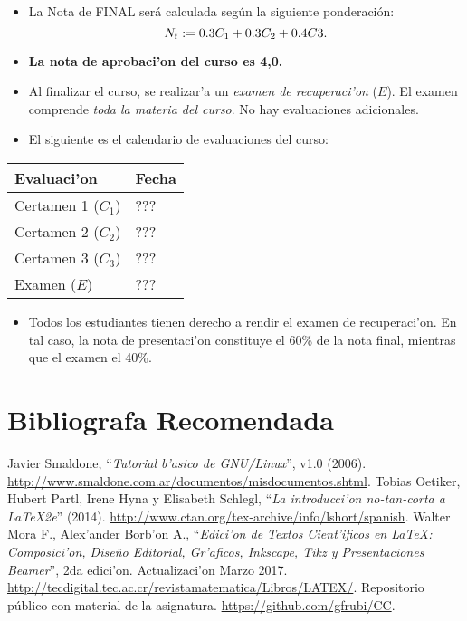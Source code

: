 \documentclass[letterpaper,11pt]{exam}
\begin{document}
\begin{multicols}{2}
\begin{itemize}
\item La Nota de FINAL ser\'a calculada seg\'un la siguiente ponderaci\'on:
{\small
\begin{equation}
N_{\rm f} :=0.3C_1+0.3C_2 + 0.4C3.
\end{equation}
}
\item \textbf{La nota de aprobaci'on del curso es 4,0.}
\item Al finalizar el curso, se realizar'a un \textit{examen de recuperaci'on} ($E$). El examen comprende \textit{toda la materia del curso}. No hay evaluaciones adicionales.

\item El siguiente es el calendario de evaluaciones del curso:
\end{itemize} 
\begin{center}
\begin{scriptsize}
\begin{tabular}{|ll|}
\hline 
Evaluaci'on &  Fecha\\
\hline
Certamen 1 ($C_1$) & ??? \\ 
Certamen 2 ($C_2$) & ??? \\ 
Certamen 3 ($C_3$) & ???\\ 
Examen ($E$) & ??? \\ 
\hline 
\end{tabular} 
\end{scriptsize}
\end{center}
\begin{itemize}
\item Todos los estudiantes tienen derecho a rendir el examen de recuperaci'on. En tal caso, la nota de presentaci'on constituye el 60\% de la nota final, mientras que el examen el 40\%.
\end{itemize}

\section{Bibliografa Recomendada}

\begin{thebibliography}{77}	%
\small
{} Javier Smaldone, ``\textit{Tutorial b'asico de GNU/Linux}'',  v1.0 (2006).
\url{http://www.smaldone.com.ar/documentos/misdocumentos.shtml}.
 Tobias Oetiker, Hubert Partl, Irene Hyna y Elisabeth Schlegl, ``\textit{La introducci'on no-tan-corta a \LaTeX 2e}'' (2014). \url{http://www.ctan.org/tex-archive/info/lshort/spanish}.
 Walter Mora F., Alex'ander Borb'on A., ``\textit{Edici'on de Textos Cient'ificos en \LaTeX: Composici'on, Dise\~no Editorial, Gr'aficos, Inkscape, Tikz y Presentaciones Beamer}'', 2da edici'on. Actualizaci'on Marzo 2017. \url{http://tecdigital.tec.ac.cr/revistamatematica/Libros/LATEX/}.
 Repositorio p\'ublico con material de la asignatura. \url{https://github.com/gfrubi/CC}.
\end{thebibliography}	


\end{multicols}
\end{document}
